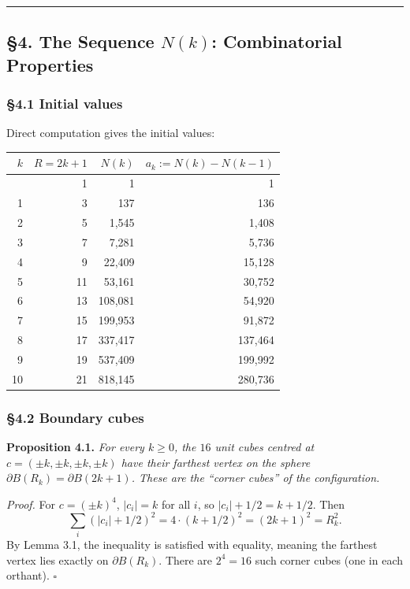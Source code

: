 \documentclass[a4paper,11pt]{article}
\theoremstyle{definition}
\begin{document}
\begin{center}\rule{0.5\linewidth}{0.5pt}\end{center}

\subsection{\texorpdfstring{§4. The Sequence \(N(k)\): Combinatorial
Properties}{§4. The Sequence N(k): Combinatorial Properties}}\label{the-sequence-nk-combinatorial-properties}

\subsubsection{§4.1 Initial values}\label{initial-values}

Direct computation gives the initial values:

{\def\LTcaptype{none} %
\begin{longtable}[]{@{}rrrr@{}}
\toprule\noalign{}
\(k\) & \(R = 2k+1\) & \(N(k)\) & \(a_k := N(k) - N(k-1)\) \\
\midrule\noalign{}
\endhead
\bottomrule\noalign{}
\endlastfoot
0 & 1 & 1 & 1 \\
1 & 3 & 137 & 136 \\
2 & 5 & 1,545 & 1,408 \\
3 & 7 & 7,281 & 5,736 \\
4 & 9 & 22,409 & 15,128 \\
5 & 11 & 53,161 & 30,752 \\
6 & 13 & 108,081 & 54,920 \\
7 & 15 & 199,953 & 91,872 \\
8 & 17 & 337,417 & 137,464 \\
9 & 19 & 537,409 & 199,992 \\
10 & 21 & 818,145 & 280,736 \\
\end{longtable}
}

\subsubsection{§4.2 Boundary cubes}\label{boundary-cubes}

\textbf{Proposition 4.1.} \emph{For every \(k \ge 0\), the \(16\) unit
cubes centred at \(c = (\pm k, \pm k, \pm k, \pm k)\) have their
farthest vertex on the sphere \(\partial B(R_k) = \partial B(2k+1)\).
These are the ``corner cubes'' of the configuration.}

\emph{Proof.} For \(c = (\pm k)^4\), \(|c_i| = k\) for all \(i\), so
\(|c_i| + 1/2 = k + 1/2\). Then
\[\sum_i (|c_i| + 1/2)^2 = 4 \cdot (k + 1/2)^2 = (2k + 1)^2 = R_k^2.\]
By Lemma 3.1, the inequality is satisfied with equality, meaning the
farthest vertex lies exactly on \(\partial B(R_k)\). There are
\(2^4 = 16\) such corner cubes (one in each orthant). \(\square\)
\end{document}
